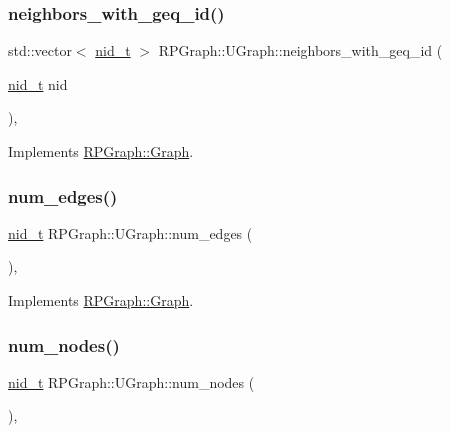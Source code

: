\subsubsection{\texorpdfstring{neighbors\+\_\+with\+\_\+geq\+\_\+id()}{neighbors\_with\_geq\_id()}}
{\footnotesize\ttfamily std\+::vector$<$ \mbox{\hyperlink{namespaceRPGraph_ab3ae34f1ab88e48f43794c30c8697b74}{nid\+\_\+t}} $>$ R\+P\+Graph\+::\+U\+Graph\+::neighbors\+\_\+with\+\_\+geq\+\_\+id (\begin{DoxyParamCaption}\item[{\mbox{\hyperlink{namespaceRPGraph_ab3ae34f1ab88e48f43794c30c8697b74}{nid\+\_\+t}}}]{nid }\end{DoxyParamCaption})\hspace{0.3cm}{\ttfamily [override]}, {\ttfamily [virtual]}}



Implements \mbox{\hyperlink{classRPGraph_1_1Graph_ab1e27e4268d36443a5db035fa7635cad}{R\+P\+Graph\+::\+Graph}}.

\mbox{\label{classRPGraph_1_1UGraph_a55a5deea9a4d456e78e24a2002f31ef2}} 
\subsubsection{\texorpdfstring{num\+\_\+edges()}{num\_edges()}}
{\footnotesize\ttfamily \mbox{\hyperlink{namespaceRPGraph_ab3ae34f1ab88e48f43794c30c8697b74}{nid\+\_\+t}} R\+P\+Graph\+::\+U\+Graph\+::num\+\_\+edges (\begin{DoxyParamCaption}{ }\end{DoxyParamCaption})\hspace{0.3cm}{\ttfamily [override]}, {\ttfamily [virtual]}}



Implements \mbox{\hyperlink{classRPGraph_1_1Graph_acd3b877216686aff2f7fbc2d62bcdf9b}{R\+P\+Graph\+::\+Graph}}.

\mbox{\label{classRPGraph_1_1UGraph_ad5eb18fffb7b9a64819b3f1f38305a0c}} 
\subsubsection{\texorpdfstring{num\+\_\+nodes()}{num\_nodes()}}
{\footnotesize\ttfamily \mbox{\hyperlink{namespaceRPGraph_ab3ae34f1ab88e48f43794c30c8697b74}{nid\+\_\+t}} R\+P\+Graph\+::\+U\+Graph\+::num\+\_\+nodes (\begin{DoxyParamCaption}{ }\end{DoxyParamCaption})\hspace{0.3cm}{\ttfamily [override]}, {\ttfamily [virtual]}}



